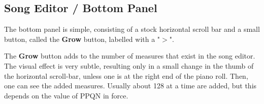 \subsection{Song Editor / Bottom Panel}
\label{subsec:seq64_song_editor_bottom}

   The bottom panel is simple, consisting of a stock horizontal scroll bar
   and a small button, called the \textbf{Grow} button, labelled with a
   "\textbf{$>$}".

   The \textbf{Grow} button adds to the number of measures that exist
   in the song editor. The visual effect is very subtle, resulting only
   in a small change in the thumb of the horizontal scroll-bar, unless one
   is at the right end of the piano roll.  Then, one can see the added
   measures.  Usually about 128 at a time are added, but this depends on the
   value of PPQN in force.

